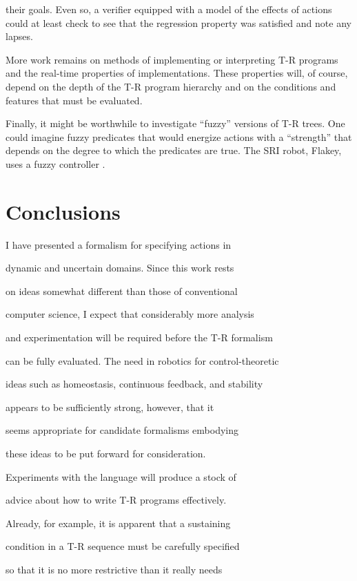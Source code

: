 their goals.  Even so, a verifier equipped with a model of the effects of  
actions could at least check to see that the regression property was  
satisfied and note any lapses.  


More work remains on methods of implementing or interpreting T-R programs and  
the real-time properties of implementations.  These properties will, of  
course, depend on the depth of the T-R program hierarchy and on the  
conditions and features that must be evaluated.

Finally, it might be worthwhile to investigate ``fuzzy'' versions of T-R  
trees.  One could imagine fuzzy  predicates that would energize actions with  
a ``strength'' that depends on the degree to which the predicates are true.   
The SRI robot, Flakey, uses a fuzzy controller \cite{Flakey}.



\section{Conclusions}

I have presented a formalism for specifying actions in 

dynamic and uncertain domains.  Since this work rests 

on ideas somewhat different than those of conventional 

computer science, I expect that considerably more analysis 

and experimentation will be required before the T-R formalism 

can be fully evaluated.  The need in robotics for control-theoretic 

ideas such as homeostasis, continuous feedback, and stability 

appears to be  sufficiently strong, however, that it 

seems appropriate for candidate formalisms  embodying 

these ideas to be put forward for consideration. 


Experiments with the language will produce a stock of 

advice about how to write T-R programs effectively.  

Already, for example,  it is apparent that a sustaining 

condition in a T-R sequence must be carefully specified 

so that it is no more restrictive than it really needs 

